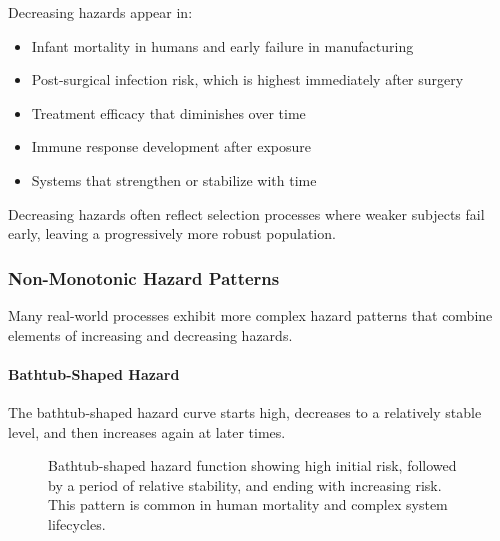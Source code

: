 Decreasing hazards appear in:
\begin{itemize}
    \item Infant mortality in humans and early failure in manufacturing
    \item Post-surgical infection risk, which is highest immediately after surgery
    \item Treatment efficacy that diminishes over time
    \item Immune response development after exposure
    \item Systems that strengthen or stabilize with time
\end{itemize}

Decreasing hazards often reflect selection processes where weaker subjects fail early, leaving a progressively more robust population.

\subsubsection{Non-Monotonic Hazard Patterns}

Many real-world processes exhibit more complex hazard patterns that combine elements of increasing and decreasing hazards.

\paragraph{Bathtub-Shaped Hazard}

The bathtub-shaped hazard curve starts high, decreases to a relatively stable level, and then increases again at later times.

\begin{figure}[htbp]
    \centering
    \caption{Bathtub-shaped hazard function showing high initial risk, followed by a period of relative stability, and ending with increasing risk. This pattern is common in human mortality and complex system lifecycles.}
    \label{fig:bathtub-hazard}
\end{figure}

